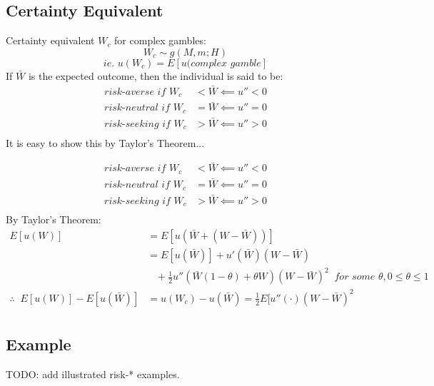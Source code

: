 \documentclass[
14pt,notheorems,hyperref={pdfauthor=whatever}
]{beamer}
\begin{document}
\subsection{Certainty Equivalent}

\begin{frame}
Certainty equivalent $W_c$ for complex gambles:
\[W_c \sim g(M,m;H)\]
\[\textit{ie. } u(W_c) = E[u(\textit{complex gamble}]\]
\hfill \break
If $\bar{W}$ is the expected outcome, then the individual is said to be:
\begin{align*}
    \textit{risk-averse if } W_c &< \bar{W} \impliedby u''<0\\
    \textit{risk-neutral if } W_c &= \bar{W} \impliedby u''=0\\
    \textit{risk-seeking if } W_c &> \bar{W} \impliedby u''>0\\
\end{align*}
It is easy to show this by Taylor's Theorem...
\end{frame}

\begin{frame}
\begin{align*}
    \textit{risk-averse if } W_c &< \bar{W} \impliedby u''<0\\
    \textit{risk-neutral if } W_c &= \bar{W} \impliedby u''=0\\
    \textit{risk-seeking if } W_c &> \bar{W} \impliedby u''>0\\
\end{align*}
By Taylor's Theorem:
\begin{align*}
    E[u(W)] &= E[u(\bar{W}+(W-\bar{W}))]\\
    &= E[u(\bar{W})]+u'(\bar{W})(W-\bar{W})\\
    &\;\;\;+\frac{1}{2}u''(\bar{W}(1-\theta)+\theta W)(W-\bar{W})^2\;\;\textit{for some }\theta, 0 \leq \theta \leq 1\\
    \therefore \;\; E[u(W)]-E[u(\bar{W})] &= u(W_c)-u(\bar{W}) = \frac{1}{2}E[u''(\cdot)(W-\bar{W})^2\\
\end{align*}
\end{frame}

\subsection{Example}

\begin{frame}
TODO: add illustrated risk-* examples.
\end{frame}
\end{document}
